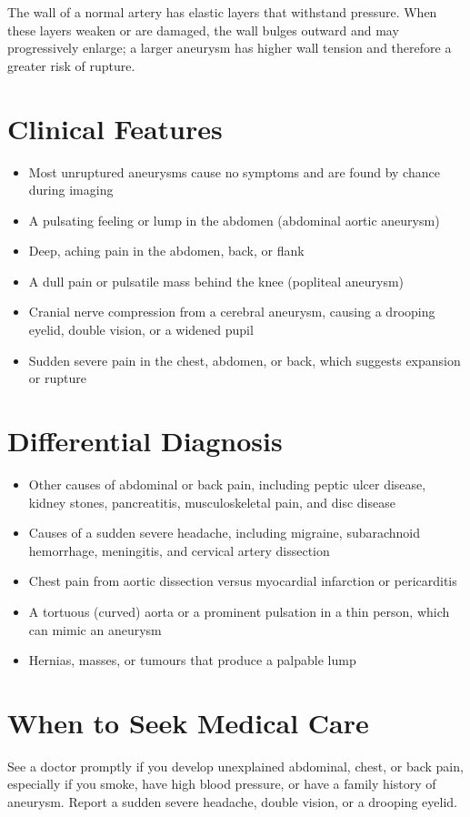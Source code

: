 The wall of a normal artery has elastic layers that withstand pressure. When these layers weaken or are damaged, the wall bulges outward and may progressively enlarge; a larger aneurysm has higher wall tension and therefore a greater risk of rupture.

\section*{Clinical Features}
\begin{itemize}
    \item Most unruptured aneurysms cause no symptoms and are found by chance during imaging
    \item A pulsating feeling or lump in the abdomen (abdominal aortic aneurysm)
    \item Deep, aching pain in the abdomen, back, or flank
    \item A dull pain or pulsatile mass behind the knee (popliteal aneurysm)
    \item Cranial nerve compression from a cerebral aneurysm, causing a drooping eyelid, double vision, or a widened pupil
    \item Sudden severe pain in the chest, abdomen, or back, which suggests expansion or rupture
\end{itemize}

\section*{Differential Diagnosis}
\begin{itemize}
    \item Other causes of abdominal or back pain, including peptic ulcer disease, kidney stones, pancreatitis, musculoskeletal pain, and disc disease
    \item Causes of a sudden severe headache, including migraine, subarachnoid hemorrhage, meningitis, and cervical artery dissection
    \item Chest pain from aortic dissection versus myocardial infarction or pericarditis
    \item A tortuous (curved) aorta or a prominent pulsation in a thin person, which can mimic an aneurysm
    \item Hernias, masses, or tumours that produce a palpable lump
\end{itemize}

\section*{When to Seek Medical Care}
See a doctor promptly if you develop unexplained abdominal, chest, or back pain, especially if you smoke, have high blood pressure, or have a family history of aneurysm. Report a sudden severe headache, double vision, or a drooping eyelid.

